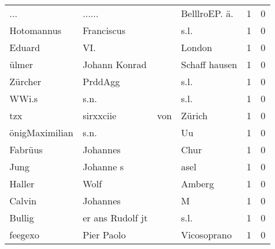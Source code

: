 \begin{tabular}{llllrr}
                      ... &                             ...... &             &                              BelllroEP. ä.  &          1 &         0 \\
               Hotomannus &                         Franciscus &             &                                        s.l. &          1 &         0 \\
                   Eduard &                                VI. &             &                                      London &          1 &         0 \\
                    ülmer &                      Johann Konrad &             &                               Schaff hausen &          1 &         0 \\
                  Zürcher &                            PrddAgg &             &                                        s.l. &          1 &         0 \\
                    WWi.s &                               s.n. &             &                                        s.l. &          1 &         0 \\
                      tzx &                          sirxxciie &         von &                                      Zürich &          1 &         0 \\
           önigMaximilian &                               s.n. &             &                                          Uu &          1 &         0 \\
                  Fabrüus &                           Johannes &             &                                        Chur &          1 &         0 \\
                     Jung &                          Johanne s &             &                                        asel &          1 &         0 \\
                   Haller &                               Wolf &             &                                      Amberg &          1 &         0 \\
                   Calvin &                           Johannes &             &                                           M &          1 &         0 \\
                   Bullig &                   er ans Rudolf jt &             &                                        s.l. &          1 &         0 \\
                  feegexo &                         Pier Paolo &             &                                 Vicosoprano &          1 &         0 \\

\end{tabular}
